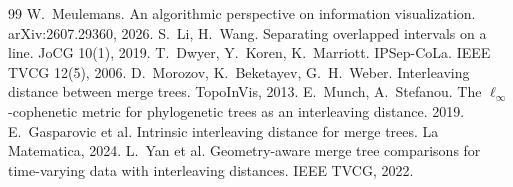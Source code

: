 \documentclass[10pt,twocolumn]{article}
\begin{document}
\begin{thebibliography}{99}
 W.~Meulemans. An algorithmic perspective on information visualization. arXiv:2607.29360, 2026.
 S.~Li, H.~Wang. Separating overlapped intervals on a line. JoCG 10(1), 2019.
 T.~Dwyer, Y.~Koren, K.~Marriott. IPSep-CoLa. IEEE TVCG 12(5), 2006.
 D.~Morozov, K.~Beketayev, G.~H.~Weber. Interleaving distance between merge trees. TopoInVis, 2013.
 E.~Munch, A.~Stefanou. The $\ell_\infty$-cophenetic metric for phylogenetic trees as an interleaving distance. 2019.
 E.~Gasparovic et al. Intrinsic interleaving distance for merge trees. La Matematica, 2024.
 L.~Yan et al. Geometry-aware merge tree comparisons for time-varying data with interleaving distances. IEEE TVCG, 2022.
\end{thebibliography}
\end{document}
